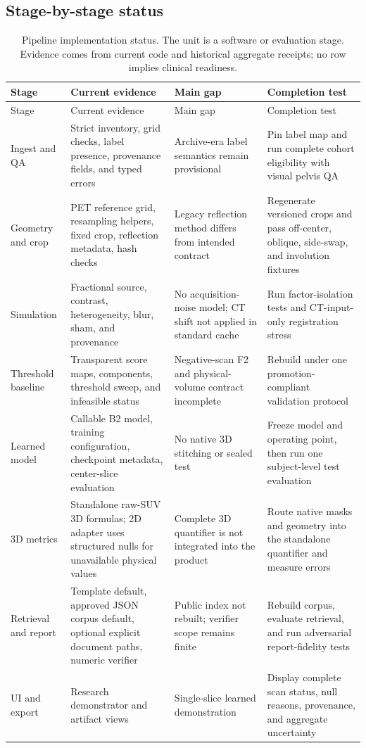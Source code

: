 \documentclass[11pt]{article}
\begin{document}
\subsection{Stage-by-stage status}

\begin{longtable}{B{0.14\textwidth} L{0.24\textwidth} L{0.24\textwidth} L{0.21\textwidth}}
\caption{Pipeline implementation status. The unit is a software or evaluation stage. Evidence comes from current code and historical aggregate receipts; no row implies clinical readiness.}\label{tab:pipeline-status}\\
\toprule
Stage & Current evidence & Main gap & Completion test \\
\midrule
\endfirsthead
\toprule
Stage & Current evidence & Main gap & Completion test \\
\midrule
\endhead
Ingest and QA & Strict inventory, grid checks, label presence, provenance fields, and typed errors & Archive-era label semantics remain provisional & Pin label map and run complete cohort eligibility with visual pelvis QA \\
Geometry and crop & PET reference grid, resampling helpers, fixed crop, reflection metadata, hash checks & Legacy reflection method differs from intended contract & Regenerate versioned crops and pass off-center, oblique, side-swap, and involution fixtures \\
Simulation & Fractional source, contrast, heterogeneity, blur, sham, and provenance & No acquisition-noise model; CT shift not applied in standard cache & Run factor-isolation tests and CT-input-only registration stress \\
Threshold baseline & Transparent score maps, components, threshold sweep, and infeasible status & Negative-scan F2 and physical-volume contract incomplete & Rebuild under one promotion-compliant validation protocol \\
Learned model & Callable B2 model, training configuration, checkpoint metadata, center-slice evaluation & No native 3D stitching or sealed test & Freeze model and operating point, then run one subject-level test evaluation \\
3D metrics & Standalone raw-SUV 3D formulas; 2D adapter uses structured nulls for unavailable physical values & Complete 3D quantifier is not integrated into the product & Route native masks and geometry into the standalone quantifier and measure errors \\
Retrieval and report & Template default, approved JSON corpus default, optional explicit document paths, numeric verifier & Public index not rebuilt; verifier scope remains finite & Rebuild corpus, evaluate retrieval, and run adversarial report-fidelity tests \\
UI and export & Research demonstrator and artifact views & Single-slice learned demonstration & Display complete scan status, null reasons, provenance, and aggregate uncertainty \\
\bottomrule
\end{longtable}
\end{document}
